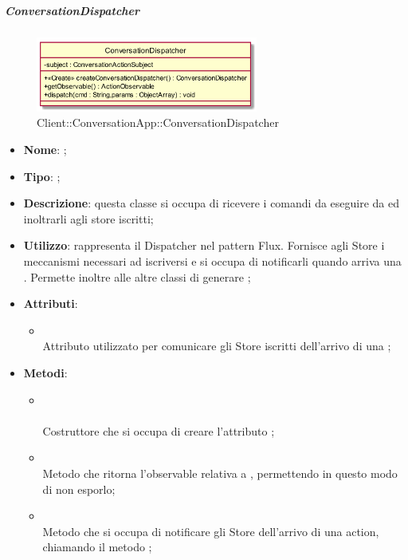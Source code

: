 \hypertarget{ConversationDispatcher_label}{\subparagraph{ConversationDispatcher}}
\begin{figure}[h]
	\centering
	\includegraphics[width=0.65\textwidth,height=\textheight,keepaspectratio]{images/ClassConversationDispatcher.png}
	\caption{Client::ConversationApp::ConversationDispatcher}
\end{figure}
\begin{itemize}
	\item \textbf{Nome}: ;
	\item \textbf{Tipo}: ;
	\item \textbf{Descrizione}: questa classe si occupa di ricevere i comandi da eseguire da  ed inoltrarli agli store iscritti;
	\item \textbf{Utilizzo}: rappresenta il Dispatcher nel pattern Flux. Fornisce agli Store i meccanismi necessari ad iscriversi e si occupa di notificarli quando arriva una . Permette inoltre alle altre classi di generare ;
	\item \textbf{Attributi}:
	\begin{itemize}
		\item[]  \\
		Attributo utilizzato per comunicare gli Store iscritti dell'arrivo di una ;
	\end{itemize}
	\item \textbf{Metodi}:
	\begin{itemize}
		\item[] \\ \\		Costruttore che si occupa di creare l'attributo ;\\
		\item[]  \\		Metodo che ritorna l'observable relativa a , permettendo in questo modo di non esporlo;\\
		\item[]  \\		Metodo che si occupa di notificare gli Store dell'arrivo di una action, chiamando il metodo ;\\

\end{itemize}
\end{itemize}
